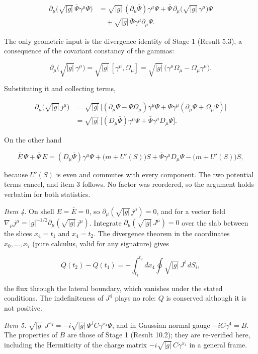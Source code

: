 \documentclass[11pt]{article}
\begin{document}
\[
\begin{aligned}
\partial_\mu\bigl(\sqrt{|g|}\,\bar\Psi\gamma^\mu\Psi\bigr)&=\sqrt{|g|}\,(\partial_\mu\bar\Psi)\gamma^\mu\Psi+\bar\Psi\,\partial_\mu\bigl(\sqrt{|g|}\,\gamma^\mu\bigr)\Psi\\
&\quad+\sqrt{|g|}\,\bar\Psi\gamma^\mu\partial_\mu\Psi .
\end{aligned}
\]

The only geometric input is the divergence identity of Stage 1 (Result 5.3), a consequence of the covariant constancy of the gammas:

\[
\partial_\mu\bigl(\sqrt{|g|}\,\gamma^\mu\bigr)=\sqrt{|g|}\,[\gamma^\mu,\Omega_\mu]=\sqrt{|g|}\,\bigl(\gamma^\mu\Omega_\mu-\Omega_\mu\gamma^\mu\bigr).
\]

Substituting it and collecting terms,

\[
\begin{aligned}
\partial_\mu\bigl(\sqrt{|g|}\,j^\mu\bigr)&=\sqrt{|g|}\,\bigl[(\partial_\mu\bar\Psi-\bar\Psi\Omega_\mu)\gamma^\mu\Psi+\bar\Psi\gamma^\mu(\partial_\mu\Psi+\Omega_\mu\Psi)\bigr]\\
&=\sqrt{|g|}\,\bigl[(D_\mu\bar\Psi)\gamma^\mu\Psi+\bar\Psi\gamma^\mu D_\mu\Psi\bigr].
\end{aligned}
\]

On the other hand

\[
\bar E\,\Psi+\bar\Psi\,E=(D_\mu\bar\Psi)\gamma^\mu\Psi+\bigl(m+U'(S)\bigr)S+\bar\Psi\gamma^\mu D_\mu\Psi-\bigl(m+U'(S)\bigr)S ,
\]

because $U'(S)$ is even and commutes with every component. The two potential terms cancel, and item 3 follows. No factor was reordered, so the argument holds verbatim for both statistics.

\emph{Item 4.} On shell $E=\bar E=0$, so $\partial_\mu(\sqrt{|g|}\,j^\mu)=0$, and for a vector field $\nabla_\mu j^\mu=|g|^{-1/2}\partial_\mu(\sqrt{|g|}\,j^\mu)$. Integrate $\partial_\mu(\sqrt{|g|}\,J^\mu)=0$ over the slab between the slices $x_4=t_1$ and $x_4=t_2$. The divergence theorem in the coordinates $x_0,\dots,x_7$ (pure calculus, valid for any signature) gives

\[
Q(t_2)-Q(t_1)=-\int_{t_1}^{t_2}dx_4\oint\sqrt{|g|}\,J^i\,dS_i ,
\]

the flux through the lateral boundary, which vanishes under the stated conditions. The indefiniteness of $J^4$ plays no role: $Q$ is conserved although it is not positive.

\emph{Item 5.} $\sqrt{|g|}\,J^{x_4}=-i\sqrt{|g|}\,\Psi^\dagger C\gamma^{x_4}\Psi$, and in Gaussian normal gauge $-iC\gamma^4=B$. The properties of $B$ are those of Stage 1 (Result 10.2); they are re-verified here, including the Hermiticity of the charge matrix $-i\sqrt{|g|}\,C\gamma^{x_4}$ in a general frame.
\end{document}
